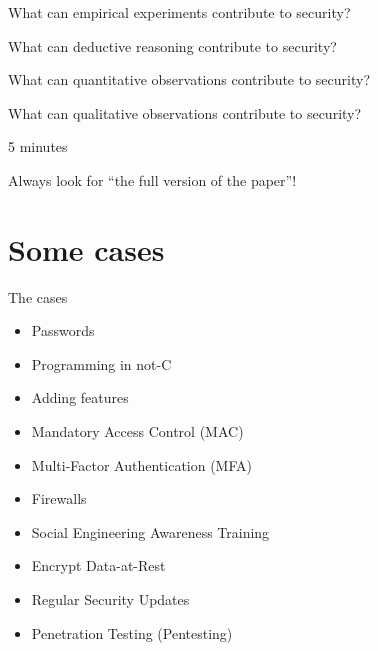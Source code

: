\begin{frame}
  \begin{question}
    What can empirical experiments contribute to security?
  \end{question}

  \begin{question}
    What can deductive reasoning contribute to security?
  \end{question}

  \begin{question}
    What can quantitative observations contribute to security?
  \end{question}

  \begin{question}
    What can qualitative observations contribute to security?
  \end{question}

  \begin{center}
    5 minutes
  \end{center}
\end{frame}

\begin{frame}
  \begin{remark}
    Always look for \enquote{the full version of the paper}!
  \end{remark}
\end{frame}


\section{Some cases}

\begin{frame}[fragile]
  \begin{block}{The cases}
    \begin{itemize}
      \item Passwords
      \item Programming in not-C
      \item Adding features
      \item Mandatory Access Control (MAC)
      \item Multi-Factor Authentication (MFA)
      \item Firewalls
      \item Social Engineering Awareness Training
      \item Encrypt Data-at-Rest
      \item Regular Security Updates
      \item Penetration Testing (Pentesting)
    \end{itemize}
  \end{block}
\end{frame}

